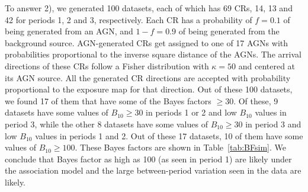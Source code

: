 To answer 2), we generated 100 datasets, each of which has 69 CRs, 14, 13 and 42 for periods
1, 2 and 3, respectively. Each CR has a probability of $f=0.1$ of being generated from an AGN,
and $1-f = 0.9$ of being generated from the background source. AGN-generated CRs get
assigned to one of 17 AGNs with probabilities proportional to the inverse square distance
of the AGNs. The arrival directions of these CRs follow a Fisher distribution with $\kappa = 50$ and
centered at its AGN source. All the generated CR directions are accepted with probability
proportional to the exposure map for that direction. Out of these 100 datasets, we found
17 of them that have some of the Bayes factors $\geq 30$.  Of these, 9 datasets have
some values of $B_{10}\geq 30$ in periods 1 or 2 and low $B_{10}$ values in period 3, while the other
8 datasets have some values of $B_{10}\geq 30$ in period 3
and low $B_{10}$ values in periods 1 and 2. Out of these 17 datasets, 10 of them have some values
of $B_{10}\geq 100$. These Bayes factors are shown in Table~\ref{tab:BFsim}.
We conclude that Bayes factor as high as 100 (as seen in period 1) are likely under the association model and the large between-period variation seen in the data are likely.



